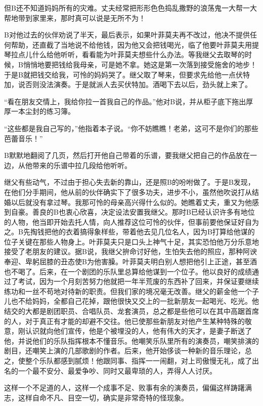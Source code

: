 \documentclass[12pt, UTF8]{ctexbook}
\begin{document}
\par 但B还不知道妈妈所有的灾难。丈夫经常把形形色色捣乱撒野的浪荡鬼一大帮一大帮地带到家里来，那时真可以说是无所不为！
\par B对他过去的伙伴劝说了半天，最后表示，如果叶菲莫夫再不改过，他决不提供任何帮助，还直截了当地说不给他钱，因为他又会把钱喝光，临了他要叶菲莫夫用提琴拉点儿什么给他听听，看看能为叶菲莫夫想些什么办法。等我继父去取琴的时候，B悄悄地要把钱给我母亲，可是她不拿。她这是第一次落到接受施舍的地步！于是B就把钱交给我，可怜的妈妈哭了。继父取了琴来，但要求先给他一点伏特加，说否则没法演奏。于是就派人去买伏特加。酒喝下去以后，劲头就上来了。
\par “看在朋友交情上，我给你拉一首我自己的作品。”他对B说，并从柜子底下拖出厚厚一本尘封的练习簿。
\par “这些都是我自己写的，”他指着本子说。“你不妨瞧瞧！老弟，这可不是你们的那些芭蕾音乐！”
\par B默默地翻阅了几页，然后打开他自己带着的乐谱，要我继父把自己的作品放在一边，从他带来的乐谱中拉几段给他听听。
\par 继父有些动气，不过由于担心失去新的靠山，还是照B的吩咐做了。于是B发现，在他们分手期间，他从前的伙伴确实下了很多功夫，进步不小，虽然他吹说打从结婚以后就没有拿过琴。我那可怜的母亲高兴得什么似的。她瞧着丈夫，重又为他感到自豪。善良的B也衷心欣喜，决定设法安置我继父。那时B已经认识许多有地位的人物，他当即开始去托人情，向人推荐这位可怜的伙伴，但事前要他保证好自为之。B先掏钱把他的衣着搞得象样些，带着他去见几位名人，因为B打算给他谋的位子关键在那些人物身上。叶菲莫夫只是口头上神气十足，其实恐怕他万分乐意地接受了老朋友的建议。据B说，我继父拚命讨好他，生怕失去他的照应，那种阿谀奉迎、卑躬屈膝的丑态使B为他害臊。叶菲莫夫明白别人想把他引上正途，甚至酒也不喝了。后来，在一个剧团的乐队里总算给他谋到一个位子。他以良好的成绩通过了考试，因为一个月刻苦努力他就把一年半荒废的东西补了回来，并保证要继续练功和一丝不苟地对待新的职责。但我们家的境况毫无改善。继父的薪金他一个子儿也不给妈妈，全都自己花掉，跟他很快又交上的一批新朋友一起喝光、吃光。他结交的大都是剧团职员、合唱队员、龙套演员，总之都是些他可以在其中高踞首席的人，对于真正有才能的却避不交往。他已使那些新朋友对他产生某种特殊的敬意，刚认识就向他们宣传，他是个被埋没的人，他有伟大的天才，是妻子断送了他，并说他们的乐队指挥根本不懂音乐。他嘲笑乐队里所有的演奏员，嘲笑排演的剧目，还嘲笑上演的几部歌剧的作者。后来，他开始侈谈一种新的音乐理论，总之，使整个乐队都感到腻烦！他跟同事、指挥一一闹翻，对上司傲慢无礼，成了出名的一个最不安分、最爱争吵、同时又最卑琐的人，弄得人人讨厌。
\par 这样一个不足道的人，这样一个成事不足、败事有余的演奏员，偏偏这样踌躇满志，这样自命不凡、目空一切，确实是非常奇特的怪现象。
\end{document}
